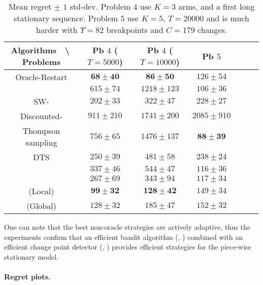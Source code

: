 \begin{table}[ht]
    \centering
    \begin{tabular}{c|cccccc}
        \textbf{Algorithms} $\;$ \textbackslash $\;$ \textbf{Problems} & Pb $4$ ($T=5000$) & Pb $4$ ($T=10000$) & Pb $5$ \\
        \hline
        Oracle-Restart \klUCB{} & $\mathbf{68 \pm 40}$ & $\mathbf{86 \pm 50}$ & $126 \pm 54$ \\
        \hline
        \klUCB{} & $615 \pm 74$ & $1218 \pm 123$ & $106 \pm 36$ \\
        SW-\klUCB{} & $202 \pm 33$ & $322 \pm 47$ & $228 \pm 27$ \\
        Discounted-\klUCB{} & $911 \pm 210$ & $1741 \pm 200$ & $2085 \pm 910$ \\
        \hline
        Thompson sampling & $756 \pm 65$ & $1476 \pm 137$ & $\mathbf{88 \pm 39}$ \\
        DTS & $250 \pm 39$ & $481 \pm 58$ & $238 \pm 24$ \\
        \hline
        \MklUCB{} & $337 \pm 46$ & $544 \pm 47$ & $116 \pm 36$ \\
        \CUSUMklUCB{} & $267 \pm 69$ & $343 \pm 94$ & $117 \pm 34$ \\
        \hline
        \GLRklUCB{}(Local) & $\mathbf{99 \pm 32}$ & $\mathbf{128 \pm 42}$ & $149 \pm 34$ \\
        \GLRklUCB{}(Global) & $128 \pm 32$ & $185 \pm 47$ & $152 \pm 32$
    \end{tabular}
    \caption{Mean regret $\pm$ $1$ std-dev. Problem $4$ use $K=3$ arms, and a first long stationary sequence. Problem $5$ use $K=5$, $T=20000$ and is much harder with $\Upsilon=82$ breakpoints and $C=179$ changes.}
    \label{table:6:totalResults2}
\end{table}

One can note that the best non-oracle strategies are actively adaptive,
thus the experiments confirm that an efficient bandit algorithm (\eg, \klUCB) combined with an efficient change point detector (\eg, \GLR) provides efficient strategies for the piece-wise stationary model.


\paragraph{Regret plots.}
\label{subsub:6:regretPlots}

